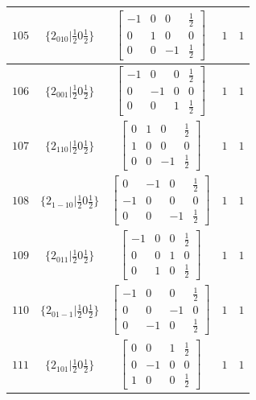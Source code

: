 \documentclass[fleqn,8pt]{jsarticle}
\begin{document}
\begin{longtable}{ccccc}
$ 105 $ & $ \{2{}_{010}|\frac{1}{2} 0 \frac{1}{2}\} $ & $ \begin{bmatrix} -1 & 0 & 0 & \frac{1}{2} \\ 0 & 1 & 0 & 0 \\ 0 & 0 & -1 & \frac{1}{2} \end{bmatrix} $ & $ 1 $ & $ 1 $ \\ \hline
$ 106 $ & $ \{2{}_{001}|\frac{1}{2} 0 \frac{1}{2}\} $ & $ \begin{bmatrix} -1 & 0 & 0 & \frac{1}{2} \\ 0 & -1 & 0 & 0 \\ 0 & 0 & 1 & \frac{1}{2} \end{bmatrix} $ & $ 1 $ & $ 1 $ \\ \hline
$ 107 $ & $ \{2{}_{110}|\frac{1}{2} 0 \frac{1}{2}\} $ & $ \begin{bmatrix} 0 & 1 & 0 & \frac{1}{2} \\ 1 & 0 & 0 & 0 \\ 0 & 0 & -1 & \frac{1}{2} \end{bmatrix} $ & $ 1 $ & $ 1 $ \\ \hline
$ 108 $ & $ \{2{}_{1-10}|\frac{1}{2} 0 \frac{1}{2}\} $ & $ \begin{bmatrix} 0 & -1 & 0 & \frac{1}{2} \\ -1 & 0 & 0 & 0 \\ 0 & 0 & -1 & \frac{1}{2} \end{bmatrix} $ & $ 1 $ & $ 1 $ \\ \hline
$ 109 $ & $ \{2{}_{011}|\frac{1}{2} 0 \frac{1}{2}\} $ & $ \begin{bmatrix} -1 & 0 & 0 & \frac{1}{2} \\ 0 & 0 & 1 & 0 \\ 0 & 1 & 0 & \frac{1}{2} \end{bmatrix} $ & $ 1 $ & $ 1 $ \\ \hline
$ 110 $ & $ \{2{}_{01-1}|\frac{1}{2} 0 \frac{1}{2}\} $ & $ \begin{bmatrix} -1 & 0 & 0 & \frac{1}{2} \\ 0 & 0 & -1 & 0 \\ 0 & -1 & 0 & \frac{1}{2} \end{bmatrix} $ & $ 1 $ & $ 1 $ \\ \hline
$ 111 $ & $ \{2{}_{101}|\frac{1}{2} 0 \frac{1}{2}\} $ & $ \begin{bmatrix} 0 & 0 & 1 & \frac{1}{2} \\ 0 & -1 & 0 & 0 \\ 1 & 0 & 0 & \frac{1}{2} \end{bmatrix} $ & $ 1 $ & $ 1 $ \\ \hline

\end{longtable}
\end{document}
